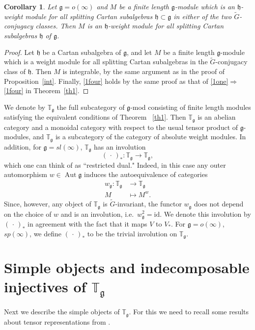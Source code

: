 \documentclass{amsart}
\renewcommand{\sl}{sl}
\newcommand{\so}{o}
\newcommand{\Tg}{\mathbb T_{\mathfrak g}}
\renewcommand{\sp}{sp}
\renewcommand{\gg}{\mathfrak{g}}
\newcommand{\hh}{\mathfrak{h}}
\newcommand{\Aut}{\operatorname{Aut}}
\newtheorem{cor}[thm]{Corollary}
\theoremstyle{definition}
\numberwithin{equation}{section}
\begin{document}
\begin{cor} \label{twoconjugacyclasses}
Let $\gg = \so(\infty)$ and $M$ be a finite length $\gg$-module which is an $\hh$-weight module for all splitting Cartan subalgebras $\hh \subset \gg$ in either of the two $\tilde{G}$-conjugacy classes.  Then $M$ is an $\hh$-weight module for all splitting Cartan subalgebras $\hh$ of $\gg$.
\end{cor}

\begin{proof}
Let $\hh$ be a Cartan subalgebra of $\gg$, and let $M$ be a finite length $\gg$-module which is a weight module for all splitting Cartan subalgebras in the $\tilde{G}$-conjugacy class of $\hh$.  Then $M$ is integrable, by the same argument as in the proof of Proposition~\ref{int}.  Finally, \eqref{1four} holds by the same proof as that of \eqref{1one}$\Rightarrow$\eqref{1four} in Theorem~\ref{th1}.
\end{proof}

We denote by $\Tg$ the full subcategory of $\gg$-mod consisting of finite length modules satisfying the
equivalent conditions of Theorem ~\ref{th1}.
Then $\Tg$ is an abelian category and a monoidal category with respect to the usual tensor product of $\gg$-modules, and $\Tg$ is a subcategory of the category of absolute weight modules.  In addition, for $\gg = \sl(\infty)$, $\Tg$ has an  
involution
$$( \, \cdot \, )_* : \Tg \rightarrow \Tg,$$
which one can think of as ``restricted dual."  Indeed, in this case any outer automorphism $w \in \Aut \gg$ induces the autoequivalence of categories
\begin{align*}
w_\gg : \Tg & \rightarrow \Tg \\
M & \mapsto M^w.
\end{align*}
Since, however, any object of $\Tg$ is $\tilde{G}$-invariant, the functor $w_\gg$ does not depend on the choice of $w$ and is an involution, i.e.\ $w_\gg^2 = \mathrm{id}$.  We denote this involution by $(\,\cdot \,)_*$ in agreement with the fact that it maps $V$ to $V_*$.  For $\gg = \so(\infty)$, $\sp(\infty)$, we define $(\, \cdot \,)_*$ to be the trivial involution on $\Tg$.

\section{Simple objects and indecomposable injectives of $\Tg$}

Next we describe the simple objects of $\Tg$.  For this we need to recall some results about tensor representations from \cite{PStyr}.
\end{document}
